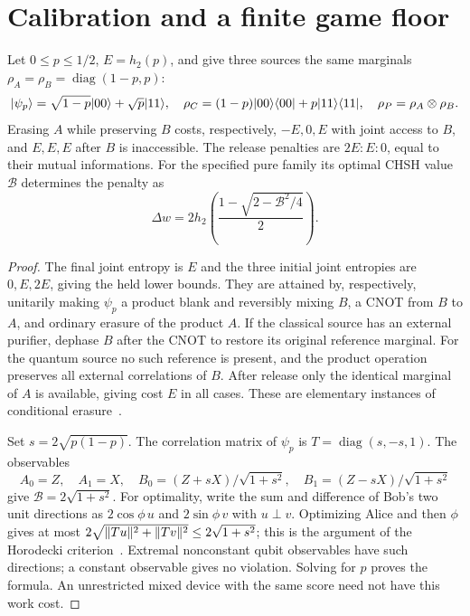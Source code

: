 \section{Calibration and a finite game floor}\label{sec:calibration}
\begin{proposition}\label{prop:calibration}
Let $0\le p\le1/2$, $E=h_2(p)$, and give three sources the same marginals $\rho_A=\rho_B=\operatorname{diag}(1-p,p)$:
\[
 |\psi_p\rangle=\sqrt{1-p}|00\rangle+\sqrt p|11\rangle,\quad
 \rho_C=(1-p)|00\rangle\langle00|+p|11\rangle\langle11|,\quad
 \rho_P=\rho_A\otimes\rho_B.
\]
Erasing $A$ while preserving $B$ costs, respectively, $-E,0,E$ with joint access to $B$, and $E,E,E$ after $B$ is inaccessible. The release penalties are $2E:E:0$, equal to their mutual informations. For the specified pure family its optimal CHSH value $\mathcal B$ determines the penalty as
\[
 \Delta w=2h_2\left(\frac{1-\sqrt{2-\mathcal B^2/4}}2\right).
\]
\end{proposition}
\begin{proof}
The final joint entropy is $E$ and the three initial joint entropies are $0,E,2E$, giving the held lower bounds. They are attained by, respectively, unitarily making $\psi_p$ a product blank and reversibly mixing $B$, a CNOT from $B$ to $A$, and ordinary erasure of the product $A$. If the classical source has an external purifier, dephase $B$ after the CNOT to restore its original reference marginal. For the quantum source no such reference is present, and the product operation preserves all external correlations of $B$. After release only the identical marginal of $A$ is available, giving cost $E$ in all cases. These are elementary instances of conditional erasure~\cite{delrio}.

Set $s=2\sqrt{p(1-p)}$. The correlation matrix of $\psi_p$ is $T=\operatorname{diag}(s,-s,1)$. The observables
\[
 A_0=Z,\quad A_1=X,\quad
 B_0=(Z+sX)/\sqrt{1+s^2},\quad B_1=(Z-sX)/\sqrt{1+s^2}
\]
give $\mathcal B=2\sqrt{1+s^2}$. For optimality, write the sum and difference of Bob's two unit directions as $2\cos\phi\,u$ and $2\sin\phi\,v$ with $u\perp v$. Optimizing Alice and then $\phi$ gives at most $2\sqrt{\lVert Tu\rVert^2+\lVert Tv\rVert^2}\le2\sqrt{1+s^2}$; this is the argument of the Horodecki criterion~\cite{horodeckichsh}. Extremal nonconstant qubit observables have such directions; a constant observable gives no violation. Solving for $p$ proves the formula. An unrestricted mixed device with the same score need not have this work cost.
\end{proof}

